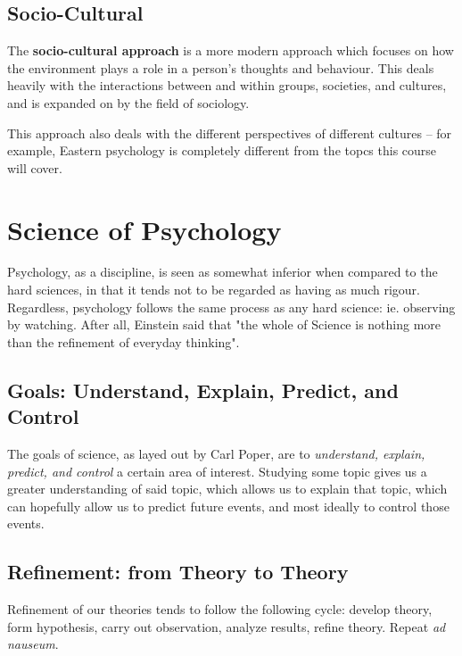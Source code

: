 \documentclass[12pt]{article}
\begin{document}
\subsection*{Socio-Cultural}
The {\bf socio-cultural approach} is a more modern approach which focuses on how the environment plays a role in a person's thoughts and behaviour. This deals heavily with the interactions between and within groups, societies, and cultures, and is expanded on by the field of sociology.

This approach also deals with the different perspectives of different cultures -- for example, Eastern psychology is completely different from the topcs this course will cover.

\section*{Science of Psychology}
Psychology, as a discipline, is seen as somewhat inferior when compared to the hard sciences, in that it tends not to be regarded as having as much rigour. Regardless, psychology follows the same process as any hard science: ie. observing by watching. After all, Einstein said that "the whole of Science is nothing more than the refinement of everyday thinking".

\subsection*{Goals: Understand, Explain, Predict, and Control}
The goals of science, as layed out by Carl Poper, are to {\it understand, explain, predict, and control} a certain area of interest. Studying some topic gives us a greater understanding of said topic, which allows us to explain that topic, which can hopefully allow us to predict future events, and most ideally to control those events.

\subsection*{Refinement: from Theory to Theory}
Refinement of our theories tends to follow the following cycle: develop theory, form hypothesis, carry out observation, analyze results, refine theory. Repeat {\it ad nauseum}.
\end{document}
